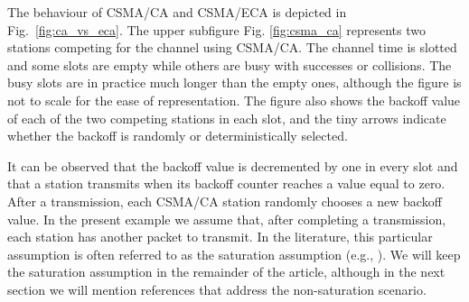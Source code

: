 \documentclass[journal]{IEEEtran}
\begin{document}
The behaviour of CSMA/CA and CSMA/ECA is depicted in Fig.~\ref{fig:ca_vs_eca}.
The upper subfigure Fig. \ref{fig:csma_ca} represents two stations competing for the channel using CSMA/CA.
The channel time is slotted and some slots are empty while others are busy with successes or collisions.
The busy slots are in practice much longer than the empty ones, although the figure is not to scale for the ease of representation.
The figure also shows the backoff value of each of the two competing stations in each slot, and the tiny arrows indicate whether the backoff is randomly or deterministically selected.

It can be observed that the backoff value is decremented by one in every slot and that a station transmits when its backoff counter reaches a value equal to zero.
After a transmission, each CSMA/CA station randomly chooses a new backoff value.
In the present example we assume that, after completing a transmission, each station has another packet to transmit.
In the literature, this particular assumption is often referred to as the saturation assumption (e.g., \cite{he2009srb,barcelo2010fcc,fang2011dlm,barcelo2011tcf}).
We will keep the saturation assumption in the remainder of the article, although in the next section we will mention references that address the non-saturation scenario.
\end{document}
